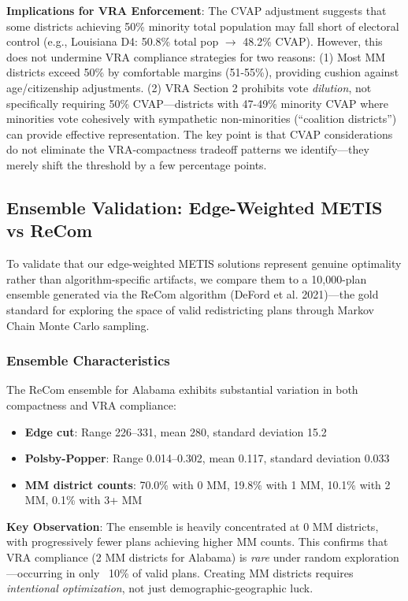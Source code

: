 \textbf{Implications for VRA Enforcement}: The CVAP adjustment suggests that some districts achieving 50\% minority total population may fall short of electoral control (e.g., Louisiana D4: 50.8\% total pop $\to$ 48.2\% CVAP). However, this does not undermine VRA compliance strategies for two reasons: (1) Most MM districts exceed 50\% by comfortable margins (51-55\%), providing cushion against age/citizenship adjustments. (2) VRA Section 2 prohibits vote \emph{dilution}, not specifically requiring 50\% CVAP---districts with 47-49\% minority CVAP where minorities vote cohesively with sympathetic non-minorities (``coalition districts'') can provide effective representation. The key point is that CVAP considerations do not eliminate the VRA-compactness tradeoff patterns we identify---they merely shift the threshold by a few percentage points.

\subsection{Ensemble Validation: Edge-Weighted METIS vs ReCom}

To validate that our edge-weighted METIS solutions represent genuine optimality rather than algorithm-specific artifacts, we compare them to a 10,000-plan ensemble generated via the ReCom algorithm (DeFord et al. 2021)---the gold standard for exploring the space of valid redistricting plans through Markov Chain Monte Carlo sampling.

\subsubsection{Ensemble Characteristics}

The ReCom ensemble for Alabama exhibits substantial variation in both compactness and VRA compliance:

\begin{itemize}
    \item \textbf{Edge cut}: Range 226--331, mean 280, standard deviation 15.2
    \item \textbf{Polsby-Popper}: Range 0.014--0.302, mean 0.117, standard deviation 0.033
    \item \textbf{MM district counts}: 70.0\% with 0 MM, 19.8\% with 1 MM, 10.1\% with 2 MM, 0.1\% with 3+ MM
\end{itemize}

\textbf{Key Observation}: The ensemble is heavily concentrated at 0 MM districts, with progressively fewer plans achieving higher MM counts. This confirms that VRA compliance (2 MM districts for Alabama) is \emph{rare} under random exploration---occurring in only ~10\% of valid plans. Creating MM districts requires \emph{intentional optimization}, not just demographic-geographic luck.


